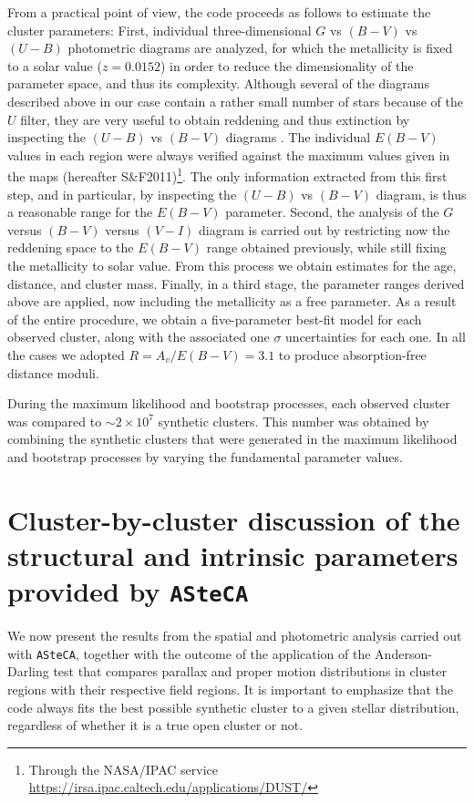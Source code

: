 \documentclass[draft]{aa}
\begin{document}
From a practical point of view, the code proceeds as follows to estimate the
cluster parameters: First, individual three-dimensional $G$ vs $(B-V)$ vs $
(U-B)$ photometric diagrams are analyzed, for which the metallicity is fixed to
a solar value ($z = 0.0152$) in order to reduce the dimensionality of the
parameter space, and thus its complexity. Although several of the diagrams
described above in our case contain a rather small number of stars because of
the $U$ filter, they are very useful to obtain reddening and thus
extinction by inspecting the $(U-B)$ vs $(B-V)$ diagrams
\citep[e.g.,][]{Vazquez2008} .
%
The individual $E(B-V)$ values in each region were always verified against
the maximum values given in the \cite{Schlafly_2011} maps (hereafter
S\&F2011)\footnote{Through the
NASA/IPAC service \url{https://irsa.ipac.caltech.edu/applications/DUST/}}.
The only information extracted from this first step, and in particular,
by inspecting the $(U-B)$ vs $(B-V)$ diagram, is thus a reasonable range for
the $E(B-V)$ parameter.
%
Second, the analysis of the $G$ versus $(B-V)$ versus $(V-I)$ diagram is carried out
by restricting now the reddening space to the $E(B-V)$ range obtained previously,
while still fixing the metallicity to solar value. From this process we obtain
estimates for the age, distance, and cluster mass.
%
Finally, in a third stage, the parameter ranges derived above are applied, now
including the metallicity as a free parameter.
As a result of the entire procedure, we obtain a five-parameter best-fit model
for each observed cluster, along with the associated one $\sigma$ uncertainties
for each one. In all the cases we adopted $R=A_v/E(B-V) = 3.1$ to produce 
absorption-free distance moduli.

During the maximum likelihood and bootstrap processes,
each observed cluster was compared to $\sim2\times10^7$
synthetic clusters. This number was obtained by combining the synthetic
clusters that were generated in the maximum likelihood and bootstrap processes by
varying the fundamental parameter values.




\section{Cluster-by-cluster discussion of the structural and intrinsic
parameters provided by \texttt{ASteCA}}
\label{sec:cluster_discuss}

We now present the results from the spatial and photometric analysis
carried out with \texttt{ASteCA}, together with the outcome of the application
of the Anderson-Darling test that compares parallax and proper motion
distributions in cluster regions with their respective field regions.
It is important to emphasize that the code always fits the
best possible synthetic cluster to a given stellar distribution, regardless of 
whether it is a true open cluster or not.
\end{document}
